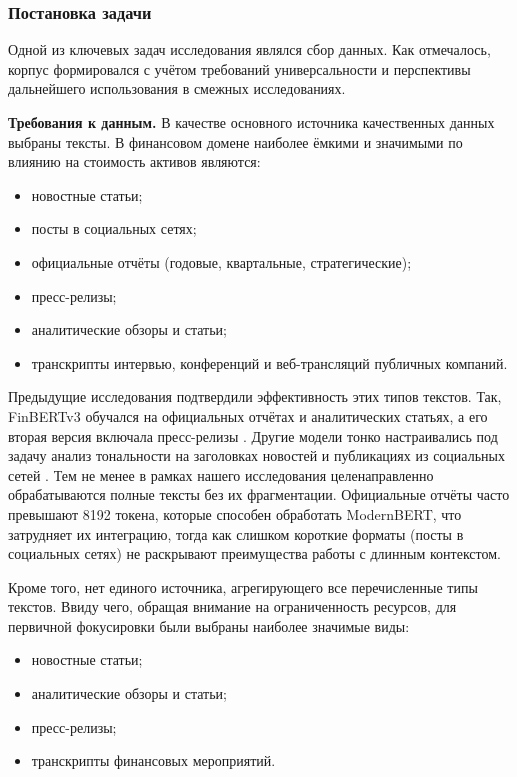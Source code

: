\subsubsection{Постановка задачи}
\label{sec:data_req}
Одной из ключевых задач исследования являлся сбор данных. Как отмечалось, корпус формировался с учётом
требований универсальности и перспективы дальнейшего использования в смежных исследованиях.

\textbf{Требования к данным.} В качестве основного источника качественных данных выбраны тексты.
В финансовом домене наиболее ёмкими и значимыми по влиянию на стоимость активов являются:

\begin{itemize}
    \item новостные статьи;
    \item посты в социальных сетях;
    \item официальные отчёты (годовые, квартальные, стратегические);
    \item пресс-релизы;
    \item аналитические обзоры и статьи;
    \item транскрипты интервью, конференций и веб-трансляций публичных компаний.
\end{itemize}

Предыдущие исследования подтвердили эффективность этих типов текстов. Так, FinBERTv3 \parencite{Yang2020FinBERT,Huang2023FinBERT}
обучался на официальных отчётах и аналитических статьях, а его вторая версия включала пресс-релизы \parencite{Liu2020FinBERT}.
Другие модели тонко настраивались под задачу анализ тональности на заголовках новостей и публикациях из социальных сетей
\parencite{Araci2019FinBERT}. Тем не менее в рамках нашего исследования целенаправленно обрабатываются полные тексты
без их фрагментации. Официальные отчёты часто превышают 8192 токена, которые способен обработать ModernBERT,
что затрудняет их интеграцию, тогда как слишком короткие форматы (посты в социальных сетях) не раскрывают
преимущества работы с длинным контекстом.

Кроме того, нет единого источника, агрегирующего все перечисленные типы текстов. Ввиду чего, обращая внимание
на ограниченность ресурсов, для первичной фокусировки были выбраны наиболее значимые виды:

\begin{itemize}
    \item новостные статьи;
    \item аналитические обзоры и статьи;
    \item пресс-релизы;
    \item транскрипты финансовых мероприятий.
\end{itemize}

